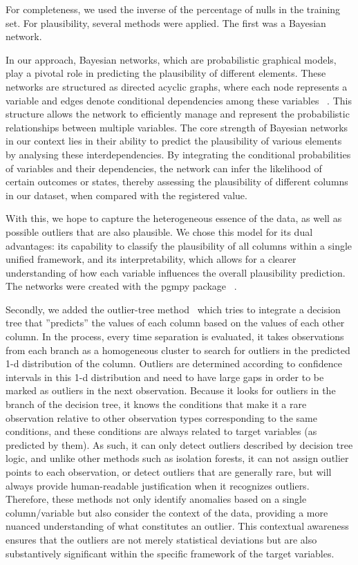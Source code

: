 
For completeness, we used the inverse of the percentage of nulls in the training set. For plausibility, several methods were applied. The first was a Bayesian network. 

In our approach, Bayesian networks, which are probabilistic graphical models, play a pivotal role in predicting the plausibility of different elements. These networks are structured as directed acyclic graphs, where each node represents a variable and edges denote conditional dependencies among these variables \unskip~\cite{pearl1988probabilistic}. This structure allows the network to efficiently manage and represent the probabilistic relationships between multiple variables. The core strength of Bayesian networks in our context lies in their ability to predict the plausibility of various elements by analysing these interdependencies. By integrating the conditional probabilities of variables and their dependencies, the network can infer the likelihood of certain outcomes or states, thereby assessing the plausibility of different columns in our dataset, when compared with the registered value. 

With this, we hope to capture the heterogeneous essence of the data, as well as possible outliers that are also plausible. We chose this model for its dual advantages: its capability to classify the plausibility of all columns within a single unified framework, and its interpretability, which allows for a clearer understanding of how each variable influences the overall plausibility prediction. The networks were created with the pgmpy package \unskip~\cite{pgmpy}. 

Secondly, we added the outlier-tree method\unskip~\cite{cortesExplainableOutlierDetection2020} which tries to integrate a decision tree that ''predicts'' the values of each column based on the values of each other column. In the process, every time separation is evaluated, it takes observations from each branch as a homogeneous cluster to search for outliers in the predicted 1-d distribution of the column. Outliers are determined according to confidence intervals in this 1-d distribution and need to have large gaps in order to be marked as outliers in the next observation. Because it looks for outliers in the branch of the decision tree, it knows the conditions that make it a rare observation relative to other observation types corresponding to the same conditions, and these conditions are always related to target variables (as predicted by them).  As such, it can only detect outliers described by decision tree logic, and unlike other methods such as isolation forests, it can not assign outlier points to each observation, or detect outliers that are generally rare, but will always provide human-readable justification when it recognizes outliers. Therefore, these methods not only identify anomalies based on a single column/variable but also consider the context of the data, providing a more nuanced understanding of what constitutes an outlier. This contextual awareness ensures that the outliers are not merely statistical deviations but are also substantively significant within the specific framework of the target variables. 

